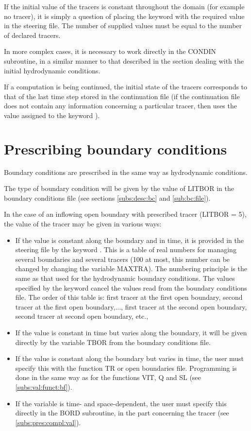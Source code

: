  If the initial value of the tracers is constant throughout the domain (for example no tracer), it is simply a question of placing the keyword  with the required value in the steering file. The number of supplied values must be equal to the number of declared tracers.

 In more complex cases, it is necessary to work directly in the CONDIN subroutine, in a similar manner to that described in the section dealing with the initial hydrodynamic conditions.

 If a computation is being continued, the initial state of the tracers corresponds to that of the last time step stored in the continuation file (if the continuation file does not contain any information concerning a particular tracer,  then uses the value assigned to the keyword ).


\section{Prescribing boundary conditions }
\label{sec:tr:prescr:bc}
 Boundary conditions are prescribed in the same way as hydrodynamic conditions.

 The type of boundary condition will be given by the value of LITBOR in the boundary conditions file (see sections \ref{subs:desc:bc} and \ref{sub:bc:file}).

 In the case of an inflowing open boundary with prescribed tracer (LITBOR = 5), the value of the tracer may be given in various ways:

\begin{itemize}
\item  If the value is constant along the boundary and in time, it is provided in the steering file by the keyword . This is a table of real numbers for managing several boundaries and several tracers (100 at most, this number can be changed by changing the variable MAXTRA). The numbering principle is the same as that used for the hydrodynamic boundary conditions. The values specified by the keyword cancel the values read from the boundary conditions file. The order of this table is: first tracer at the first open boundary, second tracer at the first open boundary,..., first tracer at the second open boundary, second tracer at second open boundary, etc.,

\item  If the value is constant in time but varies along the boundary, it will be given directly by the variable TBOR from the boundary conditions file.

\item  If the value is constant along the boundary but varies in time, the user must specify this with the function TR or open boundaries file. Programming is done in the same way as for the functions VIT, Q and SL (see \ref{subs:val:funct:bf}).

\item  If the variable is time- and space-dependent, the user must specify this directly in the BORD subroutine, in the part concerning the tracer (see \ref{subs:pres:compl:val}).
\end{itemize}

